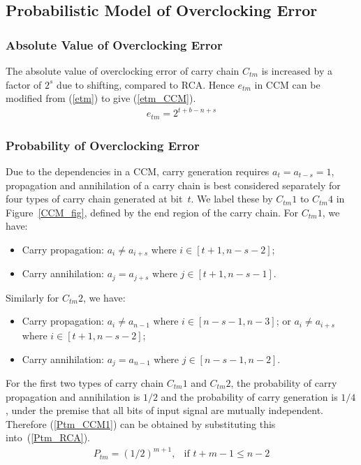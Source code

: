 \documentclass[journal]{IEEEtran}
\begin{document}
\subsection{Probabilistic Model of Overclocking Error}
\subsubsection{Absolute Value of Overclocking Error}
The absolute value of overclocking error of carry chain $C_{tm}$ is increased by a factor of $2^s$ due to shifting, compared to RCA. Hence $e_{tm}$ in CCM can be modified from (\ref{etm}) to give (\ref{etm_CCM}).
%
\begin{eqnarray}\label{etm_CCM}
  e_{tm}=2^{t+b-n+s}
\end{eqnarray}

\subsubsection{Probability of Overclocking Error}
Due to the dependencies in a CCM, carry generation requires $a_t=a_{t-s}=1$, propagation and annihilation of a carry chain is best considered separately for four types of carry chain generated at bit~$t$. We label these by $C_{tm}1$ to $C_{tm}4$ in Figure~\ref{CCM_fig}, defined by the end region of the carry chain. For $C_{tm}1$, we have:
\begin{itemize}
  \item Carry propagation: $\!a_i\neq\!a_{i+s}\!$ where $\!i\!\in[t+1,n-s-2]\!$;
  \item Carry annihilation: $\!a_j\!=\!a_{j+s}\!$ where $\!j\!\in[t+1,n-s-1]\!$.
\end{itemize}
Similarly for $C_{tm}2$, we have:
\begin{itemize}
  \item Carry propagation: $a_i\neq a_{n-1}$ where $i\in[n-s-1,n-3]$; or $a_i\neq a_{i+s}$ where $i\in[t+1,n-s-2]$;
  \item Carry annihilation: $\!a_j\!=a_{n-1}\!$ where $j\!\in\![n-s-1,n-2]$.
\end{itemize}

For the first two types of carry chain $C_{tm}1$ and $C_{tm}2$, the probability of carry propagation and annihilation is $1/2$ and the probability of carry generation is $1/4$, under the premise that all bits of input signal are mutually independent. Therefore (\ref{Ptm_CCM1}) can be obtained by substituting this into~(\ref{Ptm_RCA}).
%
\begin{eqnarray}\label{Ptm_CCM1}
  P_{tm}=\left(1/2\right)^{m+1}, & \textrm{if $t+m-1\leqslant n-2$}
\end{eqnarray}
\end{document}
